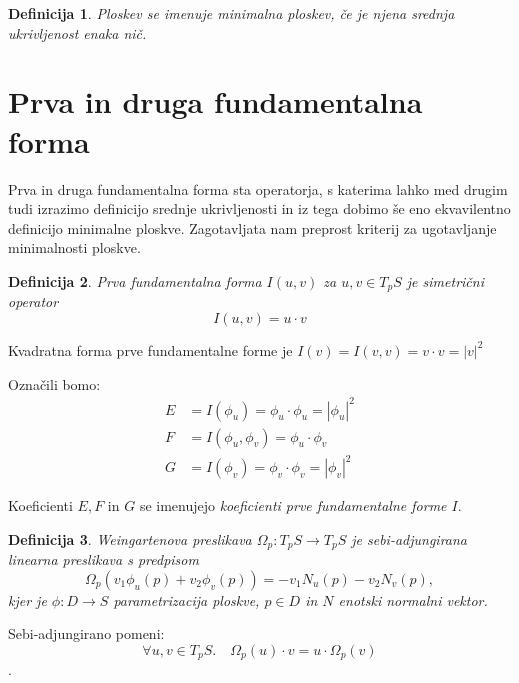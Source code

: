 \documentclass{article}
\newtheorem{definicija}{Definicija}
\begin{document}
    \begin{definicija}
        Ploskev se imenuje \emph{minimalna ploskev}, če je njena srednja ukrivljenost enaka nič.
    \end{definicija}


    \section{Prva in druga fundamentalna forma}

    Prva in druga fundamentalna forma sta operatorja, s katerima lahko med drugim tudi
    izrazimo definicijo srednje ukrivljenosti in iz tega dobimo še eno ekvavilentno definicijo
    minimalne ploskve. Zagotavljata nam preprost kriterij za ugotavljanje minimalnosti ploskve.

    \begin{definicija}
        \emph{Prva fundamentalna forma $I(u, v)$} za $u, v \in T_p S$ je simetrični operator $$I(u, v) = u \cdot v$$
    \end{definicija}

    Kvadratna forma prve fundamentalne forme je $I(v) = I(v, v) = v \cdot v = \left\lvert v \right\rvert^2$ 

    Označili bomo:
    \begin{align*}
        E &= I(\phi_u) = \phi_u \cdot \phi_u = \left\lvert \phi_u \right\rvert^2 \\
        F &= I(\phi_u, \phi_v) = \phi_u \cdot \phi_v \\
        G &= I(\phi_v) = \phi_v \cdot \phi_v = \left\lvert \phi_v \right\rvert^2
    \end{align*}

    Koeficienti $E, F \text{ in } G$ se imenujejo \emph{koeficienti prve fundamentalne forme $I$}.

    \begin{definicija}
        \emph{Weingartenova preslikava $\Omega_p: T_p S \to T_p S$} je sebi-adjungirana linearna preslikava s predpisom
        $$ \Omega_p (v_1 \phi_u (p) + v_2 \phi_v (p)) = - v_1 N_u (p) - v_2 N_v (p), $$
        kjer je $\phi : D \to S$ parametrizacija ploskve, $p \in D$ in $N$ enotski normalni vektor.
    \end{definicija}

    Sebi-adjungirano pomeni: $$ \forall u, v \in T_p S. \quad \Omega_p (u) \cdot v = u \cdot \Omega_p (v) $$.
\end{document}
